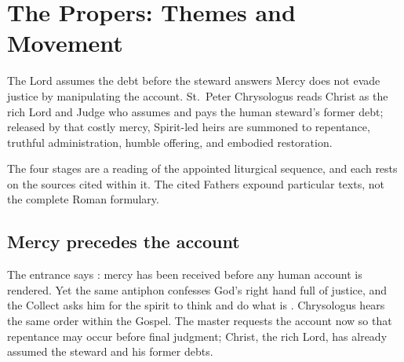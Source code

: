 \section*{The Propers: Themes and Movement}

\begin{massbox}{The Lord assumes the debt before the steward answers}
Mercy does not evade justice by manipulating the account. St.~Peter Chrysologus reads Christ as the rich Lord and Judge who assumes and pays the human steward's former debt; released by that costly mercy, Spirit-led heirs are summoned to repentance, truthful administration, humble offering, and embodied restoration.
\end{massbox}

\begin{center}
\end{center}

\noindent The four stages are a reading of the appointed liturgical sequence, and each rests on the sources cited within it. The cited Fathers expound particular texts, not the complete Roman formulary.

\subsection*{Mercy precedes the account\enspace{}}

The entrance says : mercy has been received before any human account is rendered. Yet the same antiphon confesses God's right hand full of justice, and the Collect asks him for the spirit to think and do what is . Chrysologus hears the same order within the Gospel. The master requests the account now so that repentance may occur before final judgment; Christ, the rich Lord, has already assumed the steward and his former debts.

